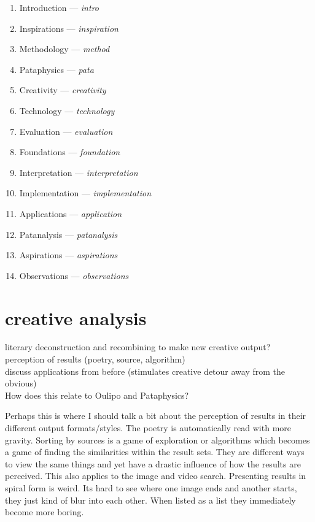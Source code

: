 {\begin{enumerate}
  \item Introduction --- \emph{intro}
  \item Inspirations --- \emph{inspiration}
  \item Methodology --- \emph{method}
  \item Pataphysics --- \emph{pata}
  \item Creativity --- \emph{creativity}
  \item Technology --- \emph{technology}
  \item Evaluation --- \emph{evaluation}
  \item Foundations --- \emph{foundation}
  \item Interpretation --- \emph{interpretation}
  \item Implementation --- \emph{implementation}
  \item Applications --- \emph{application}
  \item Patanalysis --- \emph{patanalysis}
  \item Aspirations --- \emph{aspirations}
  \item Observations --- \emph{observations}
\end{enumerate}






\section*{creative analysis}
\begin{draft}
  literary deconstruction and recombining to make new creative output? \\
  perception of results (poetry, source, algorithm) \\
  discuss applications from before (stimulates creative detour away from the obvious) \\

  How does this relate to Oulipo and Pataphysics? 

  Perhaps this is where I should talk a bit about the perception of results in their different output formats/styles. The poetry is automatically read with more gravity. Sorting by sources is a game of exploration or algorithms which becomes a game of finding the similarities within the result sets. They are different ways to view the same things and yet have a drastic influence of how the results are perceived. This also applies to the image and video search. Presenting results in spiral form is weird. Its hard to see where one image ends and another starts, they just kind of blur into each other. When listed as a list they immediately become more boring.


\end{draft}}
